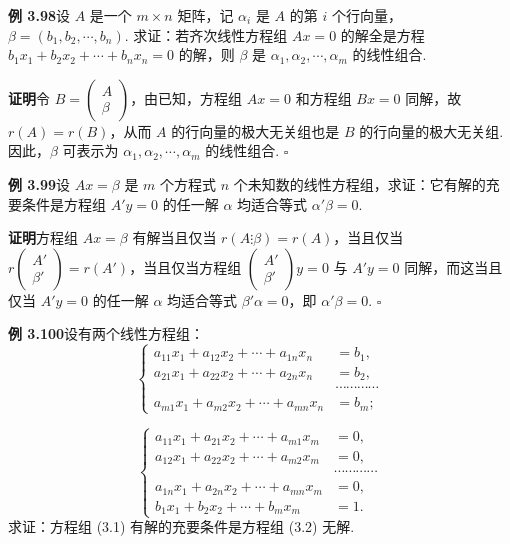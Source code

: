 \documentclass[UTF8,12pt,a4paper,fontset=fandol]{ctexart}
\begin{document}
\noindent\textbf{例 3.98}\quad 设 $A$ 是一个 $m\times n$ 矩阵，记 $\alpha_i$ 是 $A$ 的第 $i$ 个行向量，$\beta=(b_1,b_2,\cdots,b_n)$. 求证：若齐次线性方程组 $Ax=0$ 的解全是方程 $b_1x_1+b_2x_2+\cdots+b_nx_n=0$ 的解，则 $\beta$ 是 $\alpha_1,\alpha_2,\cdots,\alpha_m$ 的线性组合.

\noindent\textbf{证明}\quad 令 $B=\begin{pmatrix}A\\\beta\end{pmatrix}$，由已知，方程组 $Ax=0$ 和方程组 $Bx=0$ 同解，故 $r(A)=r(B)$，从而 $A$ 的行向量的极大无关组也是 $B$ 的行向量的极大无关组. 因此，$\beta$ 可表示为 $\alpha_1,\alpha_2,\cdots,\alpha_m$ 的线性组合. $\square$

\noindent\textbf{例 3.99}\quad 设 $Ax=\beta$ 是 $m$ 个方程式 $n$ 个未知数的线性方程组，求证：它有解的充要条件是方程组 $A'y=0$ 的任一解 $\alpha$ 均适合等式 $\alpha'\beta=0$.

\noindent\textbf{证明}\quad 方程组 $Ax=\beta$ 有解当且仅当 $r(A\vdots\beta)=r(A)$，当且仅当 $r\begin{pmatrix}A'\\\beta'\end{pmatrix}=r(A')$，当且仅当方程组 $\begin{pmatrix}A'\\\beta'\end{pmatrix}y=0$ 与 $A'y=0$ 同解，而这当且仅当 $A'y=0$ 的任一解 $\alpha$ 均适合等式 $\beta'\alpha=0$，即 $\alpha'\beta=0$. $\square$

\noindent\textbf{例 3.100}\quad 设有两个线性方程组：
\begin{equation}
\left\{
\begin{aligned}
a_{11}x_1+a_{12}x_2+\cdots+a_{1n}x_n&=b_1,\\
a_{21}x_1+a_{22}x_2+\cdots+a_{2n}x_n&=b_2,\\
&\cdots\cdots\cdots\cdots\\
a_{m1}x_1+a_{m2}x_2+\cdots+a_{mn}x_n&=b_m;
\end{aligned}
\right.
\tag{3.1}
\end{equation}

\begin{equation}
\left\{
\begin{aligned}
a_{11}x_1+a_{21}x_2+\cdots+a_{m1}x_m&=0,\\
a_{12}x_1+a_{22}x_2+\cdots+a_{m2}x_m&=0,\\
&\cdots\cdots\cdots\cdots\\
a_{1n}x_1+a_{2n}x_2+\cdots+a_{mn}x_m&=0,\\
b_1x_1+b_2x_2+\cdots+b_mx_m&=1.
\end{aligned}
\right.
\tag{3.2}
\end{equation}
求证：方程组 (3.1) 有解的充要条件是方程组 (3.2) 无解.
\end{document}
